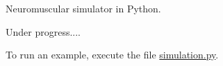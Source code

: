 Neuromuscular simulator in Python.

Under progress....

To run an example, execute the file \hyperlink{simulation_8py}{simulation.\+py}. 